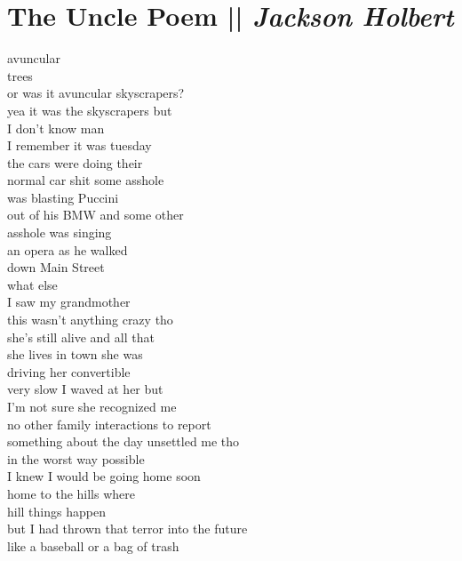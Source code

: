 \section[The Uncle Poem]{The Uncle Poem || \emph{Jackson Holbert} \hspace*{\fill}  \thepage}
\label{sec:The_Uncle_Poem}
\vspace*{0.6cm}
\begin{flushleft}
\begin{paracol}{3} %
avuncular\\
trees\\
or was it avuncular skyscrapers?\\
yea it was the skyscrapers but\\
I don’t know man\\
I remember it was tuesday\\
the cars were doing their\\
normal car shit some asshole\\
was blasting Puccini\\
out of his BMW and some other\\
asshole was singing\\
an opera as he walked\\
down Main Street\\
what else\\
I saw my grandmother\\
this wasn’t anything crazy tho\\
she’s still alive and all that\\
she lives in town she was\\
driving her convertible\\
very slow I waved at her but\\
I’m not sure she recognized me\\
no other family interactions to report\\
\switchcolumn[1]
something about the day unsettled me tho\\
in the worst way possible\\
I knew I would be going home soon \\ %
home to the hills where\\
hill things happen\\
but I had thrown that terror into the future\\
like a baseball or a bag of trash\\

\end{paracol}
\end{flushleft}
